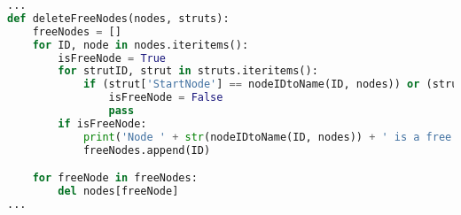 \begin{inconsolata}
\begin{minipage}{\linewidth}
\begin{lstlisting}[language=python]
...
def deleteFreeNodes(nodes, struts):
    freeNodes = []
    for ID, node in nodes.iteritems():
        isFreeNode = True
        for strutID, strut in struts.iteritems():
            if (strut['StartNode'] == nodeIDtoName(ID, nodes)) or (strut['EndNode'] == nodeIDtoName(ID, nodes)):
                isFreeNode = False
                pass
        if isFreeNode:
            print('Node ' + str(nodeIDtoName(ID, nodes)) + ' is a free node and will be deleted.')
            freeNodes.append(ID)

    for freeNode in freeNodes:
        del nodes[freeNode]
...
\end{lstlisting}
\end{minipage}
\end{inconsolata}